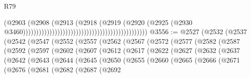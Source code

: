 \begin{lexlean}{R79}
\begin{coremodule}
                                                                                  (@2903
                                                                                    (@2908
                                                                                      (@2913
                                                                                        (@2918
                                                                                          (@2919
                                                                                            (@2920
                                                                                              (@2925
                                                                                                (@2930
                                                                                                  @3460)))))))))))))))))))))))))))))))))))))))))))))))
@3556 := @2527
    (@2532
      (@2537
        (@2542
          (@2547
            (@2552
              (@2557
                (@2562
                  (@2567
                    (@2572
                      (@2577
                        (@2582
                          (@2587
                            (@2592
                              (@2597
                                (@2602
                                  (@2607
                                    (@2612
                                      (@2617
                                        (@2622
                                          (@2627
                                            (@2632
                                              (@2637
                                                (@2642
                                                  (@2643
                                                    (@2644
                                                      (@2645
                                                        (@2650
                                                          (@2655
                                                            (@2660
                                                              (@2665
                                                                (@2666
                                                                  (@2671
                                                                    (@2676
                                                                      (@2681
                                                                        (@2682
                                                                          (@2687
                                                                            (@2692

\end{coremodule}
\end{lexlean}
